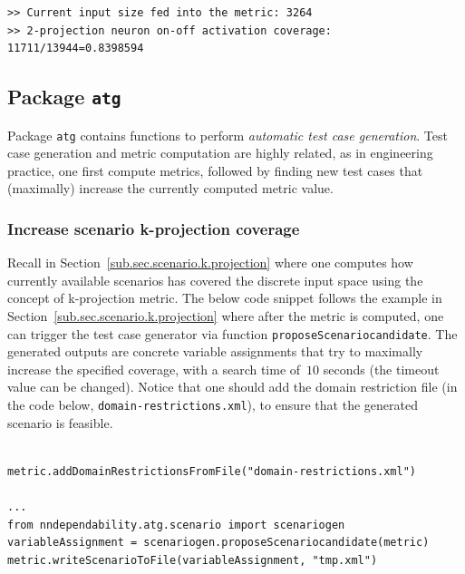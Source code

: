 \documentclass{article}
\begin{document}
\begin{small}
\color{red}
\begin{verbatim}
>> Current input size fed into the metric: 3264
>> 2-projection neuron on-off activation coverage: 11711/13944=0.8398594
\end{verbatim}
\end{small}

\subsection{Package \texttt{atg}}

Package \texttt{atg} contains functions to perform \emph{automatic test case generation}. Test case generation and metric computation are highly related, as in engineering practice, one first compute metrics, followed by finding new test cases that (maximally) increase the currently computed metric value. 

\subsubsection{Increase scenario k-projection coverage}\label{sub.sub.increase.scenario}

Recall in Section~\ref{sub.sec.scenario.k.projection} where one computes how currently available scenarios has covered the discrete input space using the concept of k-projection metric. 
The below code snippet follows the example in  Section~\ref{sub.sec.scenario.k.projection} where after the metric is computed, one can trigger the test case generator via function \texttt{proposeScenariocandidate}. The generated outputs are concrete variable assignments that try to maximally increase the specified coverage, with a search time of~$10$ seconds (the timeout value can be changed). Notice that one should add the domain restriction file (in the code below, \texttt{domain-restrictions.xml}), to ensure that the generated scenario is feasible.


\begin{small}
\color{blue}
\begin{verbatim}

metric.addDomainRestrictionsFromFile("domain-restrictions.xml")

...
from nndependability.atg.scenario import scenariogen
variableAssignment = scenariogen.proposeScenariocandidate(metric)
metric.writeScenarioToFile(variableAssignment, "tmp.xml")
\end{verbatim}
\end{small}
\end{document}
